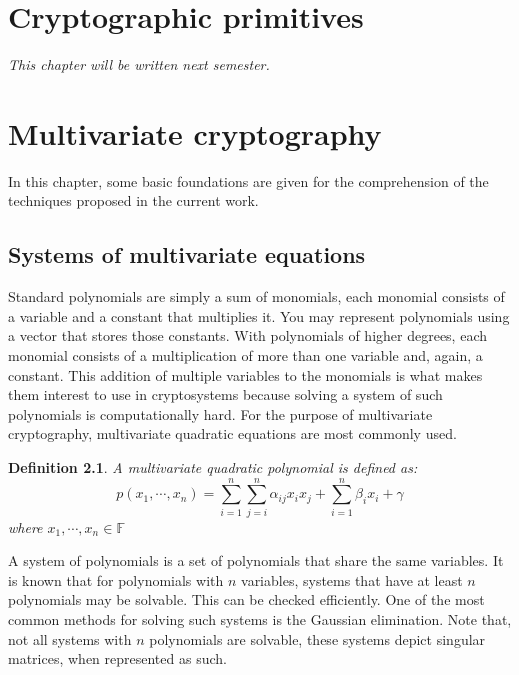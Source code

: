 \documentclass{ufsctex/ufsctex}
\newtheorem{definition}{Definition}
\begin{document}
\chapter{Cryptographic primitives}

\textit{This chapter will be written next semester.}

\chapter{Multivariate cryptography}

In this chapter, some basic foundations are given for the comprehension of the
techniques proposed in the current work.

\section{Systems of multivariate equations}

Standard polynomials are simply a sum of monomials, each monomial consists of a
variable and a constant that multiplies it. You may represent polynomials using
a vector that stores those constants. With polynomials of higher degrees, each
monomial consists of a multiplication of more than one variable and, again, a
constant. This addition of multiple variables to the monomials is what makes
them interest to use in cryptosystems because solving a system of such
polynomials is computationally hard. For the purpose of multivariate
cryptography, multivariate quadratic equations are most commonly used.

\begin{definition}
A multivariate quadratic polynomial is defined as:
\begin{equation}
p(x_1,\cdots,x_n) = \sum_{i=1}^n \sum_{j=i}^n \alpha_{ij} x_i x_j +
	\sum_{i=1}^n \beta_i x_i + \gamma
\end{equation}
where $x_1,\cdots,x_n \in \mathbb{F}$
\end{definition}

A system of polynomials is a set of polynomials that share the same variables.
It is known that for polynomials with $n$ variables, systems that have at least
$n$ polynomials may be solvable. This can be checked efficiently. One of the
most common methods for solving such systems is the Gaussian elimination. Note
that, not all systems with $n$ polynomials are solvable, these systems depict
singular matrices, when represented as such.
\end{document}
